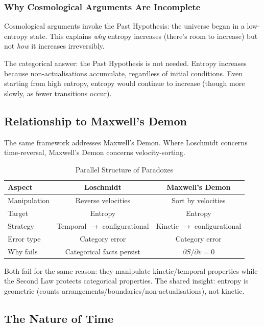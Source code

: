 \documentclass[twocolumn,10pt]{article}
\theoremstyle{definition}
\theoremstyle{remark}
\begin{document}
\subsubsection{Why Cosmological Arguments Are Incomplete}

Cosmological arguments invoke the Past Hypothesis: the universe began in a low-entropy state. This explains \textit{why} entropy increases (there's room to increase) but not \textit{how} it increases irreversibly.

The categorical answer: the Past Hypothesis is not needed. Entropy increases because non-actualisations accumulate, regardless of initial conditions. Even starting from high entropy, entropy would continue to increase (though more slowly, as fewer transitions occur).

\subsection{Relationship to Maxwell's Demon}

The same framework addresses Maxwell's Demon. Where Loschmidt concerns time-reversal, Maxwell's Demon concerns velocity-sorting.

\begin{table}[h]
\centering
\caption{Parallel Structure of Paradoxes}
\label{tab:parallel}
\begin{tabular}{lcc}
\toprule
\textbf{Aspect} & \textbf{Loschmidt} & \textbf{Maxwell's Demon} \\
\midrule
Manipulation & Reverse velocities & Sort by velocities \\
Target & Entropy & Entropy \\
Strategy & Temporal $\to$ configurational & Kinetic $\to$ configurational \\
Error type & Category error & Category error \\
Why fails & Categorical facts persist & $\partial S/\partial v = 0$ \\
\bottomrule
\end{tabular}
\end{table}

Both fail for the same reason: they manipulate kinetic/temporal properties while the Second Law protects categorical properties. The shared insight: entropy is geometric (counts arrangements/boundaries/non-actualisations), not kinetic.

\subsection{The Nature of Time}
\end{document}
